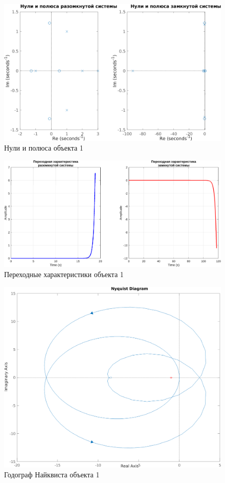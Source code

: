 \begin{figure}[H]
    \centering
    \includegraphics[width=\textwidth]{figs/task_1_obj_1_zeros_poles.png}
    \caption{Нули и полюса объекта 1}
    \label{fig:obj1_pz}
\end{figure}

\begin{figure}[H]
    \centering
    \includegraphics[width=\textwidth]{figs/task_1_obj_1_step.png}
    \caption{Переходные характеристики объекта 1}
    \label{fig:obj1_step}
\end{figure}

\begin{figure}[H]
    \centering
    \includegraphics[width=\textwidth]{figs/task_1_obj_1_nyquist.png}
    \caption{Годограф Найквиста объекта 1}
    \label{fig:obj1_nyquist}
\end{figure}

